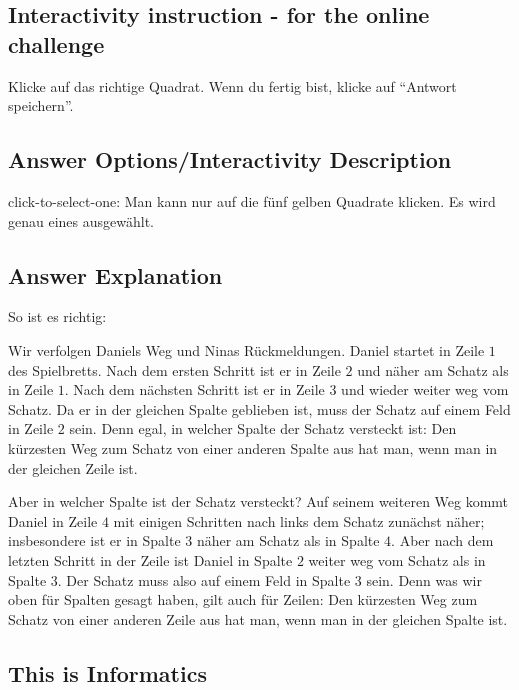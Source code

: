 \documentclass[a4paper,11pt]{report}
\newcommand{\taskGraphicsFolder}{..}
\begin{document}
\subsection*{Interactivity instruction - for the online challenge}

Klicke auf das richtige Quadrat. Wenn du fertig bist, klicke auf \enquote{Antwort speichern}.

\begingroup
\renewcommand{\arraystretch}{1.5}
\subsection*{Answer Options/Interactivity Description}

click-to-select-one:  Man kann nur auf die fünf gelben Quadrate klicken. Es wird genau eines ausgewählt.

\endgroup

\subsection*{Answer Explanation}

So ist es richtig:

{\centering%
\par}

Wir verfolgen Daniels Weg und Ninas Rückmeldungen.  Daniel startet in Zeile $1$ des Spielbretts. Nach dem ersten Schritt ist er in Zeile $2$ und näher am Schatz als in Zeile $1$.  Nach dem nächsten Schritt ist er in Zeile $3$ und wieder weiter weg vom Schatz.  Da er in der gleichen Spalte geblieben ist, muss der Schatz auf einem Feld in Zeile $2$ sein.  Denn egal, in welcher Spalte der Schatz versteckt ist:  Den kürzesten Weg zum Schatz von einer anderen Spalte aus hat man, wenn man in der gleichen Zeile ist.

Aber in welcher Spalte ist der Schatz versteckt?  Auf seinem weiteren Weg kommt Daniel in Zeile $4$ mit einigen Schritten nach links dem Schatz zunächst näher; insbesondere ist er in Spalte $3$ näher am Schatz als in Spalte $4$.  Aber nach dem letzten Schritt in der Zeile ist Daniel in Spalte $2$ weiter weg vom Schatz als in Spalte $3$.  Der Schatz muss also auf einem Feld in Spalte $3$ sein.  Denn was wir oben für Spalten gesagt haben, gilt auch für Zeilen:  Den kürzesten Weg zum Schatz von einer anderen Zeile aus hat man, wenn man in der gleichen Spalte ist.


\subsection*{This is Informatics}
\end{document}
